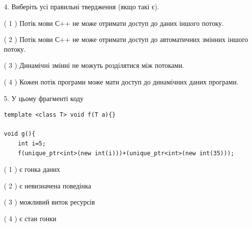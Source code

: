 \documentclass[12pt, ukrainian]{article}
\begin{document}
\begin {large}
{%
4. Виберіть усі правильні твердження (якщо такі є).\par
\vspace{2mm}

( 1 ) Потік мови С++ не може отримати доступ до даних іншого потоку.%

( 2 ) Потік мови С++ не може отримати доступ до автоматичних змінних іншого потоку.%

( 3 ) Динамічні змінні не можуть розділятися між потоками.%

( 4 ) Кожен потік програми може мати доступ до динамічних даних програми.%


5. У цьому фрагменті коду
\begin{verbatim}
template <class T> void f(T a){}

void g(){
    int i=5;
    f(unique_ptr<int>(new int(i)))+(unique_ptr<int>(new int(35)));
\end{verbatim}
( 1 ) є гонка даних%

( 2 ) є невизначена поведінка%

( 3 ) можливий виток ресурсів%

( 4 ) є стан гонки%
}
\end {large}
\end{document}
